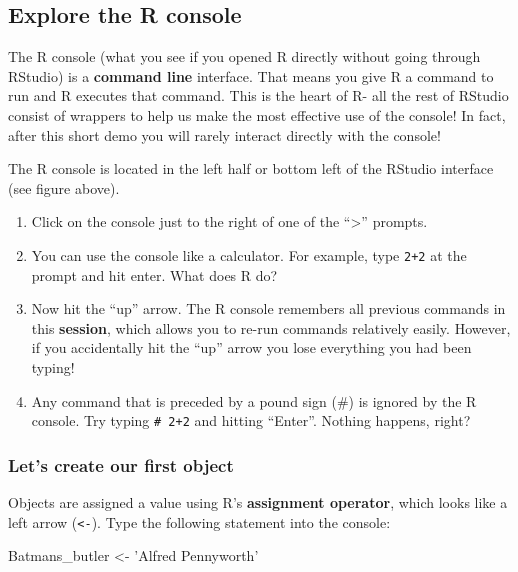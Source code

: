 \documentclass[]{article}
\newenvironment{Shaded}{\begin{snugshade}}{\end{snugshade}}
\newcommand{\StringTok}[1]{\textcolor[rgb]{0.31,0.60,0.02}{#1}}
\newcommand{\NormalTok}[1]{#1}
\begin{document}
\subsection{Explore the R console}\label{explore-the-r-console}

The R console (what you see if you opened R directly without going
through RStudio) is a \textbf{command line} interface. That means you
give R a command to run and R executes that command. This is the heart
of R- all the rest of RStudio consist of wrappers to help us make the
most effective use of the console! In fact, after this short demo you
will rarely interact directly with the console!

The R console is located in the left half or bottom left of the RStudio
interface (see figure above).

\begin{enumerate}
\def\labelenumi{\arabic{enumi}.}
\item
  Click on the console just to the right of one of the
  ``\textgreater{}'' prompts.
\item
  You can use the console like a calculator. For example, type
  \texttt{2+2} at the prompt and hit enter. What does R do?
\item
  Now hit the ``up'' arrow. The R console remembers all previous
  commands in this \textbf{session}, which allows you to re-run commands
  relatively easily. However, if you accidentally hit the ``up'' arrow
  you lose everything you had been typing!
\item
  Any command that is preceded by a pound sign (\#) is ignored by the R
  console. Try typing \texttt{\#\ 2+2} and hitting ``Enter''. Nothing
  happens, right?
\end{enumerate}

\subsubsection{Let's create our first
object}\label{lets-create-our-first-object}

Objects are assigned a value using R's \textbf{assignment operator},
which looks like a left arrow (\texttt{\textless{}-}). Type the
following statement into the console:

\begin{Shaded}
\begin{Highlighting}[]
\NormalTok{Batmans_butler <-}\StringTok{ 'Alfred Pennyworth'}
\end{Highlighting}
\end{Shaded}
\end{document}
